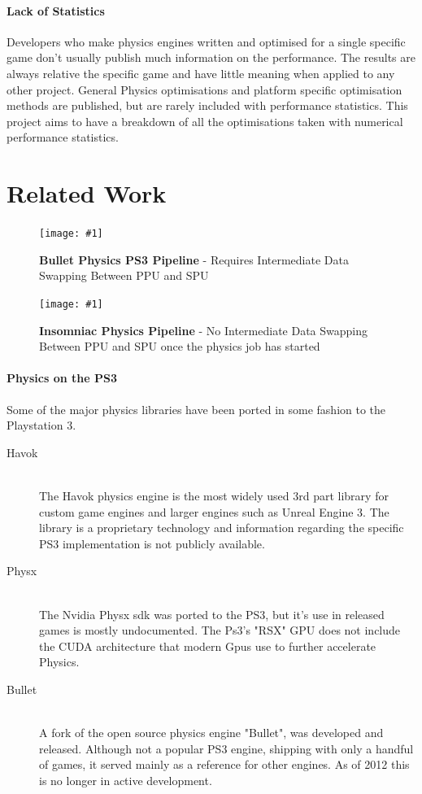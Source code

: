 \documentclass[conference]{acmsiggraph}
\newcommand{\figuremacroF}[4]{
	\begin{figure}[h] %
		\centering
		\texttt{[image: \#1]}
		\caption[#2]{\textbf{#2} - #3}
		\label{fig:#1}
	\end{figure}
}
\begin{document}
\paragraph{Lack of Statistics}
Developers who make physics engines written and optimised for a single specific game don't usually publish much information on the performance. The results are always relative the specific game and have little meaning when applied to any other project. General Physics optimisations and platform specific optimisation methods are published, but are rarely included with performance statistics. This project aims to have a breakdown of all the optimisations taken with numerical performance statistics.

\section{Related Work}

\figuremacroF
{bullet}
{Bullet Physics PS3 Pipeline}
{Requires Intermediate Data Swapping Between PPU and SPU \protect\cite{spuphys}}
{0.96}
\figuremacroF
{insomniac}
{Insomniac Physics Pipeline}
{No Intermediate Data Swapping Between PPU and SPU once the physics job has started \protect\cite{spuphys}}
{0.96}

\paragraph{Physics on the PS3}
Some of the major physics libraries have been ported in some fashion to the Playstation 3.
\begin{description}
  \item[Havok] \hfill \\
   The Havok physics engine is the most widely used 3rd part library for custom game engines and larger engines such as Unreal Engine 3. The library is a proprietary  technology and information regarding the specific PS3 implementation is not publicly available.
  \item[Physx] \hfill \\
  The Nvidia Physx sdk was ported to the PS3, but it's use in released games is mostly undocumented. The Ps3's "RSX" GPU does not include the CUDA architecture that modern Gpus use to further accelerate Physics.
  \item[Bullet] \hfill \\
  A fork of the open source physics engine "Bullet", was developed and released. Although not a popular PS3 engine, shipping with only a handful of games, it served mainly as a reference for other engines. As of 2012 this is no longer in active development.
\end{description}
\end{document}
